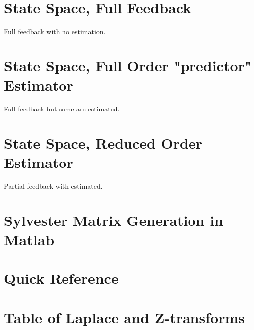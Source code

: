 \documentclass{article}
\begin{document}
\section{State Space, Full Feedback}

Full feedback with no estimation.

\section{State Space, Full Order "predictor" Estimator}

Full feedback but some are estimated.

\section{State Space, Reduced Order Estimator}

Partial feedback with estimated.

\clearpage
\printbibliography[heading=bibintoc]

\clearpage
\appendix

\section{Sylvester Matrix Generation in Matlab}
\label{app:sylvester}




\section{Quick Reference}

\section{Table of Laplace and Z-transforms}
\end{document}
